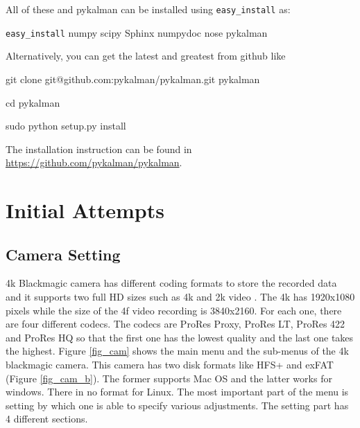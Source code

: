 \documentclass[[12pt,DIV14,BCOR12mm,a4paper,footexclude,headinclude,halfparskip-,twoside,openright,cleardoubleempty,idxtotoc,bibtotoc]{article}
\begin{document}
All of these and pykalman can be installed using \texttt{easy\_install}  as:

 \begin{framed}

\texttt{easy\_install} numpy scipy Sphinx numpydoc nose pykalman

\end{framed} 

Alternatively, you can get the latest and greatest from github like 

 \begin{framed}

git clone git@github.com:pykalman/pykalman.git pykalman

cd pykalman

 sudo python setup.py install

\end{framed} 

The installation instruction can be found in \url{https://github.com/pykalman/pykalman}.


\section{Initial Attempts}

\subsection{Camera Setting}

4k Blackmagic camera has different coding formats to store the recorded data and it supports two full HD sizes such as 4k and 2k video . The 4k has 1920x1080 pixels while the size of the 4f video recording is 3840x2160. For each one, there are four different codecs. The codecs are ProRes Proxy, ProRes LT, ProRes 422 and ProRes HQ so that the first one has the lowest quality and the last one takes the highest. Figure \ref{fig_cam} shows the main menu and the sub-menus of the 4k blackmagic camera. This camera has two  disk formats like HFS+ and exFAT (Figure \ref{fig_cam_b}). The former supports Mac OS and the latter works for windows. There in no format for Linux. The most important part of the menu is setting by which one is able to specify various adjustments. The setting part has 4 different sections.  
\end{document}
